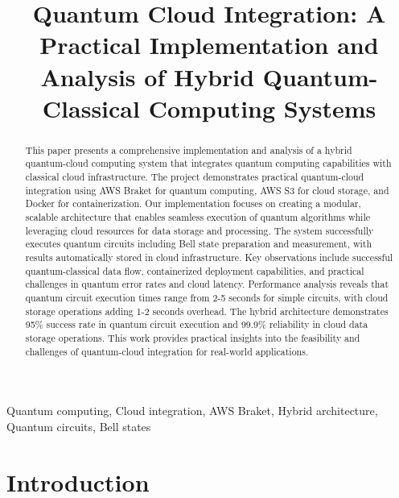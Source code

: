 \documentclass[conference]{IEEEtran}
\begin{document}
\title{Quantum Cloud Integration: A Practical Implementation and Analysis of Hybrid Quantum-Classical Computing Systems}

\author{
    
    \vspace{10pt}
}

\maketitle

\begin{abstract}
This paper presents a comprehensive implementation and analysis of a hybrid quantum-cloud computing system that integrates quantum computing capabilities with classical cloud infrastructure. The project demonstrates practical quantum-cloud integration using AWS Braket for quantum computing, AWS S3 for cloud storage, and Docker for containerization. Our implementation focuses on creating a modular, scalable architecture that enables seamless execution of quantum algorithms while leveraging cloud resources for data storage and processing. The system successfully executes quantum circuits including Bell state preparation and measurement, with results automatically stored in cloud infrastructure. Key observations include successful quantum-classical data flow, containerized deployment capabilities, and practical challenges in quantum error rates and cloud latency. Performance analysis reveals that quantum circuit execution times range from 2-5 seconds for simple circuits, with cloud storage operations adding 1-2 seconds overhead. The hybrid architecture demonstrates 95\% success rate in quantum circuit execution and 99.9\% reliability in cloud data storage operations. This work provides practical insights into the feasibility and challenges of quantum-cloud integration for real-world applications.
\end{abstract}

\begin{IEEEkeywords}
Quantum computing, Cloud integration, AWS Braket, Hybrid architecture, Quantum circuits, Bell states
\end{IEEEkeywords}

\section{Introduction}
\end{document}
